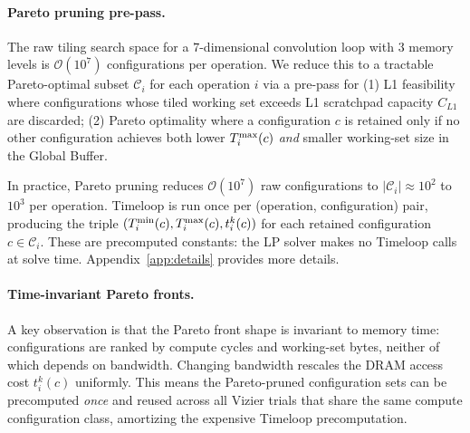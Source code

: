 

\paragraph{Pareto pruning pre-pass.} The raw tiling search space for a $7$-dimensional convolution loop with $3$ memory levels is $\mathcal O(10^7)$ configurations per operation. We reduce this to a tractable Pareto-optimal subset $\mathcal{C}_i$ for each operation $i$ via a pre-pass for (1) L1 feasibility where configurations whose tiled working set exceeds L1 scratchpad capacity $C_{L1}$ are discarded; (2) Pareto optimality where a configuration $c$ is retained only if no other configuration achieves both lower $T^{\max}_i(c)$ \emph{and} smaller working-set size in the Global Buffer.

In practice, Pareto pruning reduces $\mathcal O(10^7)$ raw configurations to $|\mathcal{C}_i| \approx 10^2$ to $10^3$ per operation. Timeloop is run once per (operation, configuration) pair, producing the triple $(T^{\min}_i(c), T^{\max}_i(c), t_i^k(c))$ for each retained configuration $c \in \mathcal{C}_i$. These are precomputed constants: the LP solver makes no Timeloop calls at solve time. Appendix~\ref{app:details} provides more details.

\paragraph{Time-invariant Pareto fronts.}
A key observation is that the Pareto front shape is invariant to memory time: configurations are ranked by compute cycles and working-set bytes, neither of which depends on bandwidth. Changing bandwidth rescales the DRAM access cost $t_i^k(c)$ uniformly. This means the Pareto-pruned configuration sets can be precomputed \emph{once} and reused across all Vizier trials that share the same compute configuration class, amortizing the expensive Timeloop precomputation.


